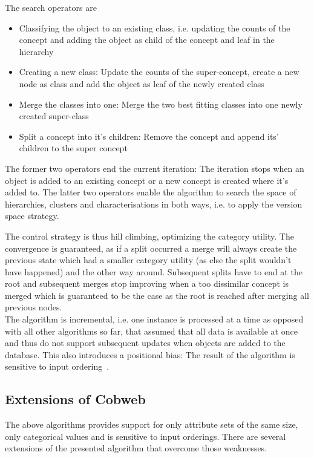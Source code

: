 The search operators are 
\begin{itemize}
    \item Classifying the object to an existing class, i.e. updating the counts of the concept and adding the object as child of the concept and leaf in the hierarchy
    \item Creating a new class: Update the counts of the super-concept, create a new node as class and add the object as leaf of the newly created class
    \item Merge the classes into one: Merge the two best fitting classes into one newly created super-class
    \item Split a concept into it's children: Remove the concept and append its' children to the super concept
\end{itemize}
The former two operators end the current iteration: The iteration stops when an object is added to an existing concept or a new concept is created where it's added to. The latter two operators enable the algorithm to search the space of hierarchies, clusters and characterisations in both ways, i.e. to apply the version space strategy.

The control strategy is thus hill climbing, optimizing the category utility. The convergence is guaranteed, as if a split occurred a merge will always create the previous state which had a smaller category utility (as else the split wouldn't have happened) and the other way around. Subsequent splits have to end at the root and subsequent merges stop improving when a too dissimilar concept is merged which is guaranteed to be the case as the root is reached after merging all previous nodes. \\

The algorithm is incremental, i.e. one instance is processed at a time as opposed with all other algorithms so far, that assumed that all data is available at once and thus do not support subsequent updates when objects are added to the database. This also introduces a positional bias: The result of the algorithm is sensitive to input ordering~\cite{classit}. \\

\subsection{Extensions of Cobweb}\label{\positionnumber}
The above algorithms provides support for only attribute sets of the same size, only categorical values and is sensitive to input orderings. There are several extensions of the presented algorithm that overcome those weaknesses. \\

